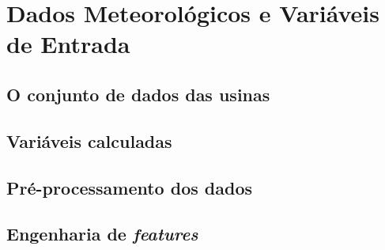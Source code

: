 

\section{Dados Meteorológicos e Variáveis de Entrada}
\label{sec:dados}

\subsection{O conjunto de dados das usinas}
\label{subsec:dataset_usinas}


\subsection{Variáveis calculadas}
\label{subsec:variaveis_calculadas}


\subsection{Pré-processamento dos dados}
\label{subsec:preprocessamento}


\subsection{Engenharia de \textit{features}}
\label{subsec:feature_engineering}

